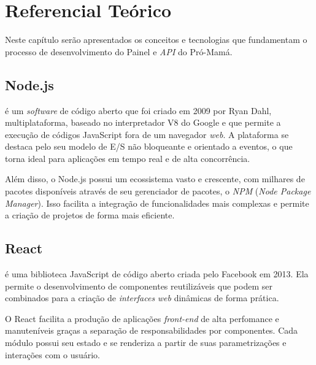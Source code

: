 \chapter{Referencial Teórico}




Neste capítulo serão apresentados os conceitos e tecnologias que fundamentam o processo de desenvolvimento do Painel e \emph{API} do Pró-Mamá.

\section{Node.js}

 é um \emph{software} de código aberto que foi criado em 2009 por Ryan Dahl, multiplataforma, baseado no interpretador V8 do Google e que permite a execução de códigos JavaScript fora de um navegador \emph{web}. A plataforma se destaca pelo seu modelo de E/S não bloqueante e orientado a eventos, o que torna ideal para aplicações em tempo real e de alta concorrência.

Além disso, o Node.js possui um ecossistema vasto e crescente, com milhares de pacotes disponíveis através de seu gerenciador de pacotes, o \emph{NPM} (\emph{Node Package Manager}). Isso facilita a integração de funcionalidades mais complexas e permite a criação de projetos de forma mais eficiente.

\section{React}

 é uma biblioteca JavaScript de código aberto criada pelo Facebook em 2013. Ela permite o desenvolvimento de componentes reutilizáveis que podem ser combinados para a criação de \emph{interfaces} \emph{web} dinâmicas de forma prática.

O React facilita a produção de aplicações \emph{front-end} de alta perfomance e manuteníveis graças a separação de responsabilidades por componentes. Cada módulo possui seu estado e se renderiza a partir de suas parametrizações e interações com o usuário.

